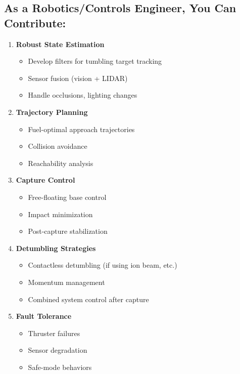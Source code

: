 \documentclass[11pt,a4paper]{article}
\begin{document}
\subsection{As a Robotics/Controls Engineer, You Can Contribute:}

\begin{enumerate}
    \item \textbf{Robust State Estimation}
    \begin{itemize}
        \item Develop filters for tumbling target tracking
        \item Sensor fusion (vision + LIDAR)
        \item Handle occlusions, lighting changes
    \end{itemize}

    \item \textbf{Trajectory Planning}
    \begin{itemize}
        \item Fuel-optimal approach trajectories
        \item Collision avoidance
        \item Reachability analysis
    \end{itemize}

    \item \textbf{Capture Control}
    \begin{itemize}
        \item Free-floating base control
        \item Impact minimization
        \item Post-capture stabilization
    \end{itemize}

    \item \textbf{Detumbling Strategies}
    \begin{itemize}
        \item Contactless detumbling (if using ion beam, etc.)
        \item Momentum management
        \item Combined system control after capture
    \end{itemize}

    \item \textbf{Fault Tolerance}
    \begin{itemize}
        \item Thruster failures
        \item Sensor degradation
        \item Safe-mode behaviors
    \end{itemize}
\end{enumerate}
\end{document}
